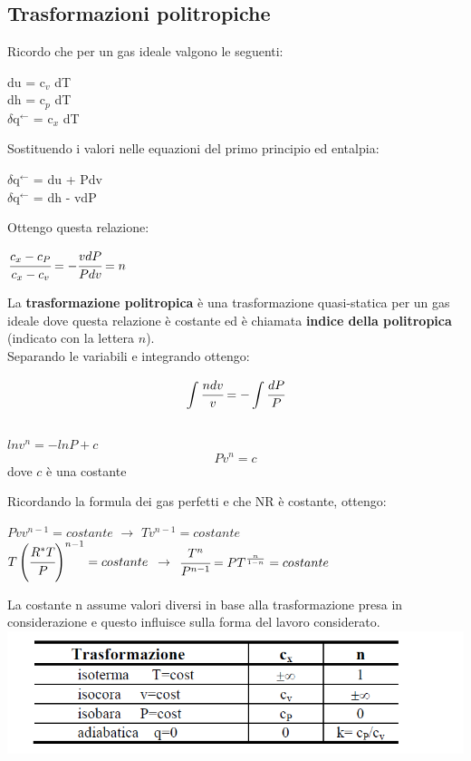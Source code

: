 \documentclass[a4paper,12pt,titlepage]{article}
\begin{document}
\subsection{Trasformazioni politropiche}
Ricordo che per un gas ideale valgono le seguenti:
\begin{center}
du = c$_{v}$ dT\\
dh = c$_{p}$ dT\\
$\delta$q$^{\leftarrow}$ = c$_{x}$ dT 
\end{center}
Sostituendo i valori nelle equazioni del primo principio ed entalpia: 
\begin{center}
$\delta$q$^{\leftarrow}$ = du + Pdv \\
$\delta$q$^{\leftarrow}$ = dh - vdP
\end{center}
Ottengo questa relazione:
\begin{center}
$\cfrac{c_{x}-c_{P}}{c_{x}-c_{v}}=- \cfrac{vdP}{Pdv} = n$
\end{center}
La \textbf{trasformazione politropica} è una trasformazione quasi-statica per un gas ideale dove questa relazione è costante ed è chiamata \textbf{indice della politropica} (indicato con la lettera $n$).\\
Separando le variabili e integrando ottengo:
\begin{center}
$$\int\cfrac{ndv}{v}=-\int\cfrac{dP}{P}$$\\
$lnv^{n} = -lnP + c$\\ 
$$Pv^{n} = c$$ dove $c$ è una costante
\end{center}
Ricordando la formula dei gas perfetti e che NR è costante, ottengo:
\begin{center}
$Pvv^{n-1} = costante$ $\rightarrow$ $Tv^{n-1} = costante$\\
$T\left( \cfrac{R^{*}T}{P} \right)^{n-1} = costante$ $\rightarrow$ $\cfrac{T^{n}}{P^{n-1}}=PT^{\frac{n}{1-n}} =costante$\\
\end{center}
La costante n assume valori diversi in base alla trasformazione presa in considerazione e questo influisce sulla forma del lavoro considerato. \\
\includegraphics[scale=0.5]{cp_cvPNG}
\end{document}
